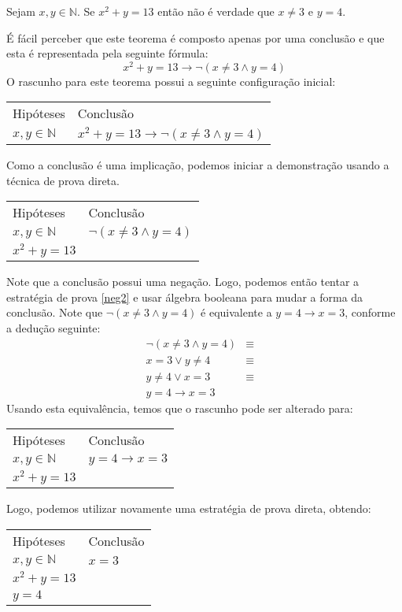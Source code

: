 \begin{Example}
\begin{flushleft}
Sejam $x,y\in\mathbb{N}$. Se $x^2 + y = 13$ então  não é verdade que $x \neq 3$ e $y = 4$.
\end{flushleft}
É fácil perceber que este teorema é composto apenas por uma conclusão
e que esta é representada pela seguinte fórmula:
\[
x^2 + y = 13 \to \neg (x \neq 3 \land y = 4)
\]
O rascunho para este teorema possui a seguinte configuração inicial:
\begin{flushleft}
\begin{tabular}{ll}
Hipóteses & Conclusão \\
 $x,y\in\mathbb{N}$ & $x^2 + y = 13 \to \neg (x \neq 3 \land y = 4)$
\end{tabular}
\end{flushleft}
Como a conclusão é uma implicação, podemos iniciar a demonstração
usando a técnica de prova direta.
\begin{flushleft}
\begin{tabular}{ll}
Hipóteses & Conclusão \\
$x,y\in\mathbb{N}$ & $\neg (x \neq 3 \land y = 4)$\\
 $x^2 + y = 13$ & \\
\end{tabular}
\end{flushleft}
Note que a conclusão possui uma negação. Logo, podemos então tentar a
estratégia de prova \ref{neg2} e usar álgebra booleana para mudar a
forma da conclusão. Note que $\neg (x \neq 3 \land y = 4)$ é
equivalente a $y = 4 \to x = 3$, conforme a dedução seguinte:
\[
\begin{array}{lcl}
\neg(x \neq 3 \land y = 4) & \equiv &\\
x = 3 \lor y \neq 4 & \equiv & \\
y \neq 4 \lor x = 3 & \equiv & \\
y = 4 \to x = 3 & &
\end{array}
\]
Usando esta equivalência, temos que o rascunho pode ser alterado para:
\begin{flushleft}
\begin{tabular}{ll}
Hipóteses & Conclusão \\
$x,y\in\mathbb{N}$ & $y = 4 \to x = 3$\\
 $x^2 + y = 13$ & \\
\end{tabular}
\end{flushleft}
Logo, podemos utilizar novamente uma estratégia de prova direta,
obtendo:
\begin{flushleft}
\begin{tabular}{ll}
Hipóteses & Conclusão \\
$x,y\in\mathbb{N}$ & $x = 3$\\
 $x^2 + y = 13$ & \\
$y = 4$ & \\
\end{tabular}
\end{flushleft}


\end{Example}
